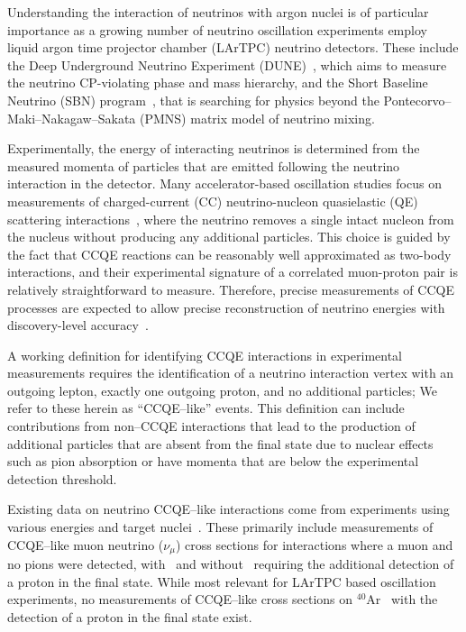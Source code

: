 \documentclass[aps,prl,showpacs,twocolumn,superscriptaddress,letterpaper,longbibliography]{revtex4-1}
\newcommand{\argon}{$^{40}$Ar\,\,}
\begin{document}
Understanding the interaction of neutrinos with argon nuclei is of particular importance
as a growing number of neutrino oscillation experiments employ liquid argon time projector chamber (LArTPC) neutrino detectors.
These include the Deep Underground Neutrino Experiment (DUNE)~\cite{Abi:2020wmh,Abi:2020evt,Abi:2020oxb,Abi:2020loh}, 
which aims to measure the neutrino CP-violating phase and mass hierarchy, 
and the Short Baseline Neutrino (SBN) program~\cite{Antonello:2015lea}, 
that is searching for physics beyond the Pontecorvo--Maki--Nakagaw--Sakata (PMNS) matrix model of neutrino mixing.

Experimentally, the energy of interacting neutrinos is determined from the measured momenta of particles 
that are emitted following the neutrino interaction in the detector.
Many accelerator-based oscillation studies focus on measurements of 
charged-current (CC) neutrino-nucleon quasielastic (QE) scattering 
interactions~\cite{Anderson:2012jds,Nakajima:2010fp,Aguilar-Arevalo:2013dva,Abe:2014iza,Carneiro:2019jds,Abratenko:2019jqo,Fiorentini:2013ezn,Betancourt:2017uso,Walton:2014esl,Abe:2018pwo}, 
where the neutrino removes a single intact nucleon from the nucleus without producing any additional particles.
This choice is guided by the fact that CCQE reactions can be reasonably well approximated as two-body interactions, 
and their experimental signature of a correlated muon-proton pair is relatively straightforward to measure.
Therefore, precise measurements of CCQE processes are expected to allow precise reconstruction 
of neutrino energies with discovery-level accuracy~\cite{Mosel:2013fxa}. 

A working definition for identifying CCQE interactions in experimental measurements requires the identification of a 
neutrino interaction vertex with an outgoing lepton, exactly one outgoing proton, and no additional particles;
We refer to these herein as “CCQE--like” events.
This definition can include contributions from non--CCQE interactions that lead to the production
of additional particles that are absent from the final state due to nuclear effects such as pion absorption or have momenta that are below the experimental detection threshold.

Existing data on neutrino CCQE--like interactions come from experiments using various energies and target nuclei~\cite{Formaggio:2013kya}. These primarily include measurements 
of CCQE--like muon neutrino ($\nu_\mu$) cross sections for interactions where a muon and no pions were detected,
with~\cite{Fiorentini:2013ezn,Betancourt:2017uso,Walton:2014esl,Abe:2018pwo} 
and without~\cite{Anderson:2012jds,Nakajima:2010fp,Aguilar-Arevalo:2013dva,Abe:2014iza,Carneiro:2019jds,Abratenko:2019jqo} 
requiring the additional detection of a proton in the final state.
While most relevant for LArTPC based oscillation experiments,
no measurements of CCQE--like cross sections on \argon\ with the detection of a proton in the final state exist.
\end{document}
